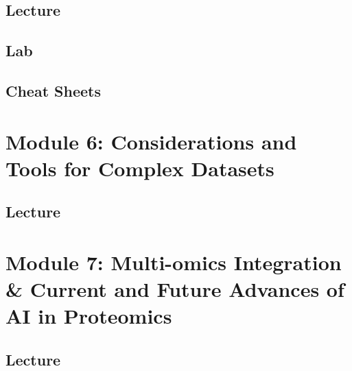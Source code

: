 \documentclass[
]{book}
\begin{document}
\section{Lecture}\label{lecture-4}

\section{Lab}\label{lab-1}

\section{Cheat Sheets}\label{cheat-sheets}

\chapter{Module 6: Considerations and Tools for Complex Datasets}\label{module-6-considerations-and-tools-for-complex-datasets}

\section{Lecture}\label{lecture-5}

\chapter{Module 7: Multi-omics Integration \& Current and Future Advances of AI in Proteomics}\label{module-7-multi-omics-integration-current-and-future-advances-of-ai-in-proteomics}

\section{Lecture}\label{lecture-6}

  
\end{document}
